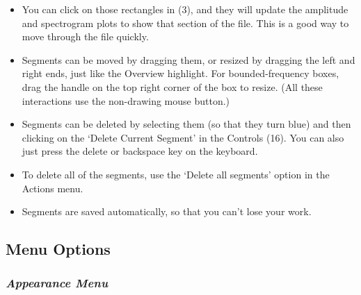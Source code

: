 \documentclass{article}
\begin{document}
\begin{itemize}
\item You can click on those rectangles in (3), and they will update the amplitude and spectrogram plots to show that section of the file. This is a good way to move through the file quickly.

\item Segments can be moved by dragging them, or resized by dragging the left and right ends, just like the Overview highlight. For bounded-frequency boxes, drag the handle on the top right corner of the box to resize. (All these interactions use the non-drawing mouse button.)

\item Segments can be deleted by selecting them (so that they turn blue) and then clicking on the `Delete Current Segment' in the Controls (16). You can also just press the delete or backspace key on the keyboard. 

\item To delete all of the segments, use the `Delete all segments' option in the Actions menu. 

\item Segments are saved automatically, so that you can't lose your work.

\end{itemize}

\subsection{Menu Options}	

\subsubsection{{\em Appearance Menu}}
\end{document}
